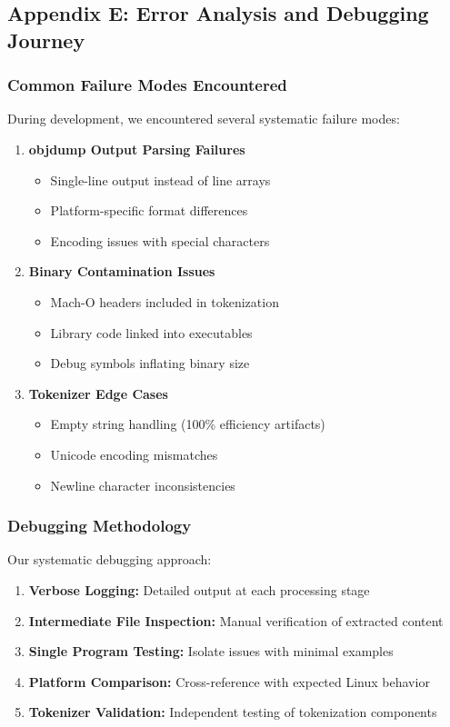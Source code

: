 \documentclass[11pt,a4paper]{article}
\begin{document}
\subsection{Appendix E: Error Analysis and Debugging Journey}

\subsubsection{Common Failure Modes Encountered}
During development, we encountered several systematic failure modes:

\begin{enumerate}
    \item \textbf{objdump Output Parsing Failures}
    \begin{itemize}
        \item Single-line output instead of line arrays
        \item Platform-specific format differences
        \item Encoding issues with special characters
    \end{itemize}
    
    \item \textbf{Binary Contamination Issues}
    \begin{itemize}
        \item Mach-O headers included in tokenization
        \item Library code linked into executables
        \item Debug symbols inflating binary size
    \end{itemize}
    
    \item \textbf{Tokenizer Edge Cases}
    \begin{itemize}
        \item Empty string handling (100\% efficiency artifacts)
        \item Unicode encoding mismatches
        \item Newline character inconsistencies
    \end{itemize}
\end{enumerate}

\subsubsection{Debugging Methodology}
Our systematic debugging approach:
\begin{enumerate}
    \item \textbf{Verbose Logging:} Detailed output at each processing stage
    \item \textbf{Intermediate File Inspection:} Manual verification of extracted content
    \item \textbf{Single Program Testing:} Isolate issues with minimal examples
    \item \textbf{Platform Comparison:} Cross-reference with expected Linux behavior
    \item \textbf{Tokenizer Validation:} Independent testing of tokenization components
\end{enumerate}
\end{document}
